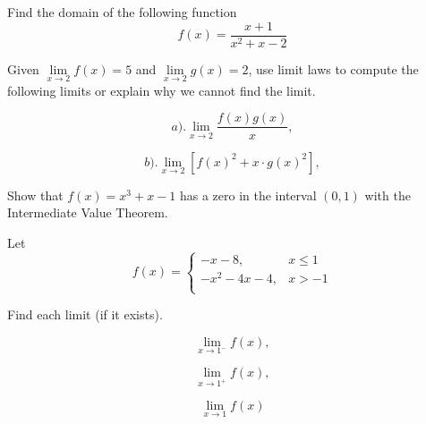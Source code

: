 \documentclass[11pt]{exam}
\begin{document}
\begin{questions}

\addpoints
\question[4] Find the domain of the following function
\[
f(x)=\frac{x+1}{x^{2}+x-2}
\]
\vfill


\addpoints
\question[6] 
Given $\lim\limits_{x\to 2} f(x)=5$ and $\lim\limits_{x\to 2} g(x)=2$, use limit laws to compute the following limits or explain why we cannot find the limit.
 
\begin{minipage}{.3\linewidth}
\begin{equation*}
a).  \lim_{x\to 2} \frac{f(x)g(x)}{x},
\end{equation*}
\end{minipage}%
\begin{minipage}{.6\linewidth}
\begin{equation*}
b).  \lim_{x\to 2}[f(x)^{2}+x\cdot g(x)^{2}],
\end{equation*}
\end{minipage}%




\vfill


\question[10]
Show that $f(x)=x^{3}+x-1$ has a zero in the interval $(0,1)$ with the Intermediate Value Theorem.

\vfill




\newpage

\addpoints
\question[6] 
Let 
\[   f(x)=\left\{
\begin{array}{ll}
      -x-8, & x\leq 1 \\
      -x^{2}-4x-4,     & x > -1\\
\end{array} 
\right. \]


Find each limit (if it exists).

\begin{minipage}{.3\linewidth}
\begin{equation*}
 \lim_{x\to 1^{-}}f(x),
\end{equation*}
\end{minipage}%
\begin{minipage}{.3\linewidth}
\begin{equation*}
 \lim_{x\to 1^{+}}f(x),
\end{equation*}
\end{minipage}%
\begin{minipage}{.3\linewidth}
\begin{equation*}
 \lim_{x\to 1}f(x)
\end{equation*}
\end{minipage}


\end{questions}
\end{document}
